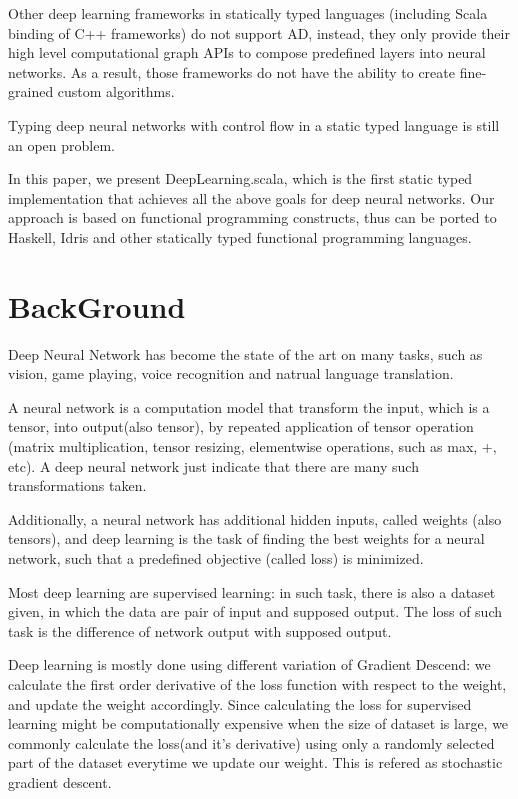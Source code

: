 Other deep learning frameworks in statically typed languages (including Scala binding of C++ frameworks) \cite{intel2016bigdl,skymind2017deeplearning4j,baydin2016hype,chen2017typesafe,zhao2017deepdsl} do not support AD, instead, they only provide their high level \gls{computational graph} APIs to compose predefined layers into neural networks. As a result, those frameworks do not have the ability to create fine-grained custom algorithms.

Typing deep neural networks with control flow in a static typed language is still an open problem.

In this paper, we present DeepLearning.scala, which is the first static typed implementation that achieves all the above goals for deep neural networks. Our approach is based on functional programming constructs, thus can be ported to Haskell, Idris and other statically typed functional programming languages.

\section{BackGround}
Deep Neural Network has become the state of the art on many tasks, such as vision, game playing, voice recognition and natrual language translation.

A neural network is a computation model that transform the input, which is a tensor, into output(also tensor), by repeated application of tensor operation (matrix multiplication, tensor resizing, elementwise operations, such as max, +, etc). A deep neural network just indicate that there are many such transformations taken.

Additionally, a neural network has additional hidden inputs, called weights (also tensors), and deep learning is the task of finding the best weights for a neural network, such that a predefined objective (called loss) is minimized.

Most deep learning are supervised learning: in such task, there is also a dataset given, in which the data are pair of input and supposed output. The loss of such task is the difference of network output with supposed output.

Deep learning is mostly done using different variation of Gradient Descend: we calculate the first order derivative of the loss function with respect to the weight, and update the weight accordingly. Since calculating the loss for supervised learning might be computationally expensive when the size of dataset is large, we commonly calculate the loss(and it's derivative) using only a randomly selected part of the dataset everytime we update our weight. This is refered as stochastic gradient descent.

